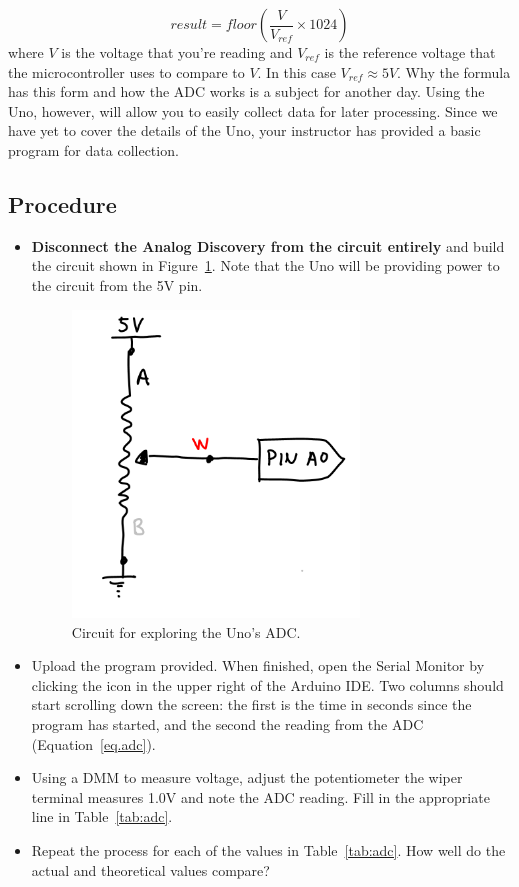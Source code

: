 \documentclass[11pt]{article} %
\begin{document}
\begin{equation}
result = floor \left( \frac{V}{V_{ref}} \times 1024\right)
\label{eq.adc}
\end{equation}
%
where $V$ is the voltage that you’re reading and $V_{ref}$ is the reference voltage that the microcontroller uses to compare to $V$. In this case $V_{ref}\approx 5V$. Why the formula has this form and how the ADC works is a subject for another day. Using the Uno, however, will allow you to easily collect data for later processing. Since we have yet to cover the details of the Uno, your instructor has provided a basic program for data collection.

\subsection*{Procedure}

\begin{itemize}
\item {\bf Disconnect the Analog Discovery from the circuit entirely} and build the circuit shown in Figure~\ref{fig:adc.uno}. Note that the Uno will be providing power to the circuit from the 5V pin.

\begin{figure}
\centering
\includegraphics[width=3in ]{figures/adc}
\caption{Circuit for exploring the Uno’s ADC.}
\label{fig:adc.uno}
\end{figure}

\item Upload the program provided. When finished, open the Serial Monitor by clicking the icon in the upper right of the Arduino IDE. Two columns should start scrolling down the screen: the first is the time in seconds since the program has started, and the second the reading from the ADC (Equation~\ref{eq.adc}).
\item Using a DMM to measure voltage, adjust the potentiometer the wiper terminal measures 1.0V and note the ADC reading. Fill in the appropriate line in Table~\ref{tab:adc}.
\item Repeat the process for each of the values in Table~\ref{tab:adc}. How well do the actual and theoretical values compare?
\end{itemize}
\end{document}

